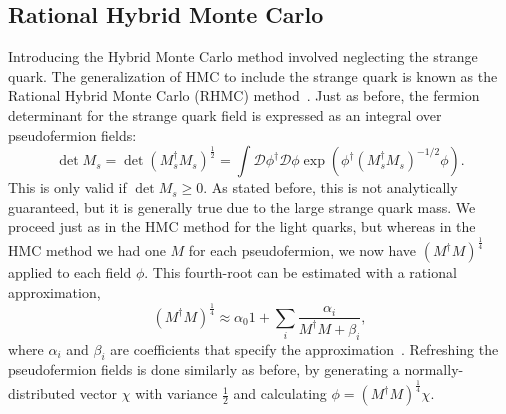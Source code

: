 \subsection{Rational Hybrid Monte Carlo}
Introducing the Hybrid Monte Carlo method involved neglecting the strange quark. The generalization of HMC to include the strange quark is known as the Rational Hybrid Monte Carlo (RHMC) method~\cite{Clark:2006wq}. Just as before, the fermion determinant for the strange quark field is expressed as an integral over pseudofermion fields:
\begin{equation}
    \operatorname{det} M_{s}=\operatorname{det}\left(M_{s}^{\dagger} M_{s}\right)^{\frac{1}{2}}=\int \mathcal{D} \phi^\dagger \mathcal{D}\phi \exp \left(\phi^{\dagger}\left(M_{s}^{\dagger} M_{s}\right)^{-1 / 2} \phi\right).
\end{equation}
This is only valid if $\det M_s \geq 0$. As stated before, this is not analytically guaranteed, but it is generally true due to the large strange quark mass. We proceed just as in the HMC method for the light quarks, but whereas in the HMC method we had one $M$ for each pseudofermion, we now have $(M^\dagger M)^{\frac{1}{4}}$ applied to each field $\phi$. This fourth-root can be estimated with a rational approximation,
\begin{equation}
    \left(M^{\dagger} M\right)^{\frac{1}{4}} \approx \alpha_{0} 1+\sum_{i} \frac{\alpha_{i}}{M^{\dagger} M+\beta_{i}},
\end{equation}
where $\alpha_i$ and $\beta_i$ are coefficients that specify the approximation~\cite{Clark:2006wq}. Refreshing the pseudofermion fields is done similarly as before, by generating a normally-distributed vector $\chi$ with variance $\frac{1}{2}$ and calculating $\phi = (M^\dagger M)^{\frac{1}{4}}\chi$.